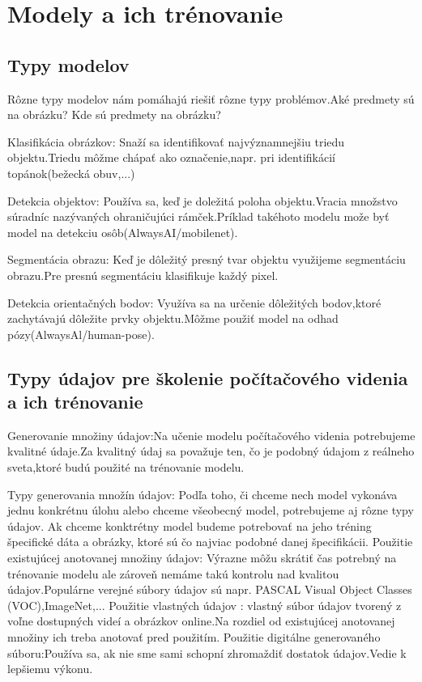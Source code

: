 \documentclass[10pt,twoside,slovak,a4paper]{article}
\begin{document}
\section{Modely a ich trénovanie} \label{nejaka}

\subsection{Typy modelov} \label{ina:nejako}
Rôzne typy modelov nám pomáhajú riešiť rôzne typy problémov.Aké predmety sú na obrázku? Kde sú predmety na obrázku?

 Klasifikácia obrázkov: Snaží sa identifikovať najvýznamnejšiu triedu objektu.Triedu môžme chápať ako označenie,napr. pri identifikácií topánok(bežecká obuv,...)

Detekcia objektov: Používa sa, keď je doležitá poloha objektu.Vracia množstvo súradníc nazývaných ohraničujúci rámček.Príklad takéhoto modelu može byť model na detekciu osôb(AlwaysAI/mobilenet).

Segmentácia obrazu: Keď je dôležitý presný tvar objektu využijeme segmentáciu obrazu.Pre presnú segmentáciu klasifikuje každý pixel.\cite{Object-identification}

 Detekcia orientačných bodov: Využíva sa na určenie dôležitých bodov,ktoré zachytávajú dôležite prvky objektu.Môžme použiť model na odhad pózy(AlwaysAl/human-pose).
\cite{CV-framework}


\subsection{Typy údajov pre školenie počítačového videnia a ich trénovanie}
Generovanie množiny údajov:Na učenie modelu počítačového videnia potrebujeme kvalitné údaje.Za kvalitný údaj sa považuje ten, čo je podobný údajom z reálneho sveta,ktoré budú použité na trénovanie modelu.


Typy generovania množín údajov: Podľa toho, či chceme nech model vykonáva jednu konkrétnu úlohu alebo chceme všeobecný model, potrebujeme aj rôzne typy údajov.
Ak chceme konktrétny model budeme potrebovať na jeho tréning špecifické dáta a obrázky, ktoré sú čo najviac podobné danej špecifikácii.
Použitie existujúcej anotovanej množiny údajov: Výrazne môžu skrátiť čas potrebný na trénovanie modelu ale zároveň nemáme takú kontrolu nad kvalitou údajov.Populárne verejné súbory údajov sú napr. PASCAL Visual Object Classes (VOC),ImageNet,...
Použitie vlastných údajov : vlastný súbor údajov tvorený z voľne dostupných videí a obrázkov online.Na rozdiel od existujúcej anotovanej množiny ich treba anotovať pred použitím. Použitie digitálne generovaného súboru:Používa sa, ak nie sme sami schopní zhromaždiť dostatok údajov.Vedie k lepšiemu výkonu.
\cite{CV-framework}
\end{document}
